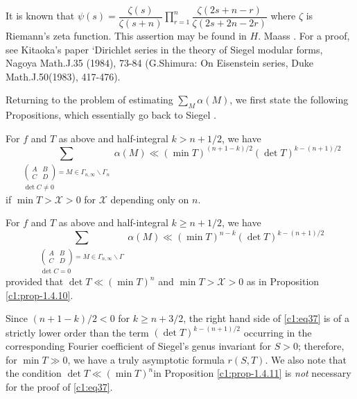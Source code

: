 It is known that
$\psi(s)=\dfrac{\zeta(s)}{\zeta(s+n)}\prod\limits^{n}_{r=1}\dfrac{\zeta(2s+n-r)}{\zeta(2s+2n-2r)}$
where $\zeta$ is Riemann's zeta function. This assertion may be found
in $H$. Maass \cite{key17}. For a proof, see Kitaoka's paper `Dirichlet
series in the theory of Siegel modular forms, Nagoya Math.J.\@ 35
(1984), 73-84 (\cf G.\@ Shimura: On Eisenstein series, Duke
Math.J.50(1983), 417-476).

Returning to the problem of estimating $\sum\limits_{M}\alpha(M)$, we
first state the following Propositions, which essentially go back to
Siegel \cite{key25}.

\setcounter{subprop}{9}
\begin{subprop}\label{c1:prop-1.4.10}
For $f$ and $T$ as above and half-integral $k>n+1/2$, we have
\begin{equation*}
\sum_{\substack{\left(\begin{smallmatrix} A & B\\ C & D
    \end{smallmatrix}\right)=M\in \Gamma_{n,\infty}\backslash
    \Gamma_{n}\\ \det C\neq 0}}\alpha(M)\ll (\min T)^{(n+1-k)/2}(\det
T)^{k-(n+1)/2}\tag{37}\label{c1:eq37} 
\end{equation*}
if $\min T>\mathscr{X}>0$ for $\mathscr{X}$ depending only on $n$.
\end{subprop}

\begin{subprop}\label{c1:prop-1.4.11}
For $f$ and $T$ as above and half-integral $k\geq n+1/2$, we have
\begin{equation*}
\sum_{\substack{\left(\begin{smallmatrix} A & B\\ C & D
    \end{smallmatrix}\right)=M\in \Gamma_{n,\infty}\backslash
    \Gamma\\ \det C=0}}\alpha(M)\ll (\min T)^{n-k}(\det
T)^{k-(n+1)/2}\tag{38}\label{c1:eq38} 
\end{equation*}
provided that $\det T\ll (\min T)^{n}$ and $\min T>\mathscr{X}>0$ as
in Proposition \ref{c1:prop-1.4.10}.
\end{subprop}

\begin{remarks*}
Since $(n+1-k)/2<0$ for $k\geq n+3/2$, the right hand side of
\eqref{c1:eq37} is of a strictly lower order than the term $(\det
T)^{k-(n+1)/2}$ occurring in the corresponding Fourier coefficient of
Siegel's genus invariant for $S>0$; therefore, for $\min T\gg 0$, we
have a truly asymptotic formula $r(S,T)$. We also note that the
condition $\det T\ll (\min T)^{n}$\pageoriginale in Proposition
\ref{c1:prop-1.4.11} is {\em not} necessary for the proof of \eqref{c1:eq37}. 
\end{remarks*}

